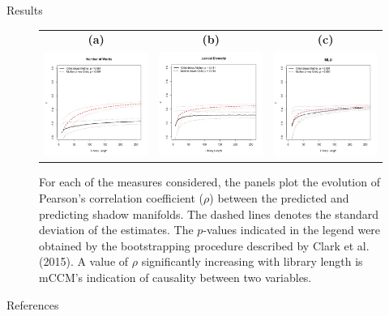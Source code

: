 \documentclass[final]{beamer}
\begin{document}
\begin{frame}{}
\begin{textblock}{28}
\begin{block}{Results}
\begin{figure}
\begin{tabular}{ccc}
{\bf (a)} & {\bf (b)} & {\bf (c)} \\
\includegraphics[width=.32\textwidth]{N_Words_Cause.jpg} &
\includegraphics[width=.32\textwidth]{Lexical_Cause.jpg} &
\includegraphics[width=.32\textwidth]{Syntactic_Cause.jpg}
\end{tabular}
\caption{For each of the measures considered, the panels plot the evolution of Pearson’s correlation coefficient ($\rho$) between the predicted and predicting shadow manifolds. The dashed lines denotes the standard deviation of the estimates. The $p$-values indicated in the legend were obtained by the bootstrapping procedure described by Clark et al. (2015). A value of $\rho$ significantly increasing with library length is mCCM’s indication of causality between two variables.}
\label{fig:results}
\end{figure}
\end{block}

\begin{block}{References}

\end{block}

\end{textblock}

\end{frame}
\end{document}
